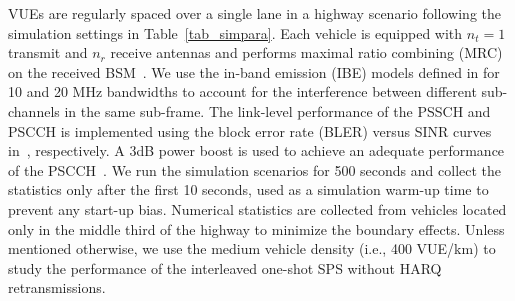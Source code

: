 \documentclass[conference]{IEEEtran}
\begin{document}
VUEs are regularly spaced over a single lane in a highway scenario following the simulation settings in Table~\ref{tab_simpara}. Each vehicle is equipped with $n_t=1$ transmit and $n_r$ receive antennas and performs maximal ratio combining (MRC) on the received BSM~\cite[Ch.~3]{D.Tse}.  We use the in-band emission (IBE) models defined in\cite{3gpp37885} for 10 and 20 MHz bandwidths to account for the interference between different sub-channels in the same sub-frame. The link-level performance of the PSSCH and PSCCH is implemented using the  block error rate (BLER) versus SINR curves in~\cite{toyota,NIST}, respectively. A 3dB power boost is used to achieve an adequate performance of the PSCCH~\cite{3gpp36213}. We run the simulation scenarios for 500 seconds and collect the statistics only after the first 10 seconds, used as a simulation warm-up time to prevent any start-up bias. Numerical statistics are collected from vehicles located only in the middle third of the highway to minimize the boundary effects. Unless mentioned otherwise, we use the medium vehicle density (i.e., 400 VUE/km) to study the performance of the interleaved one-shot SPS without HARQ retransmissions.
\end{document}
